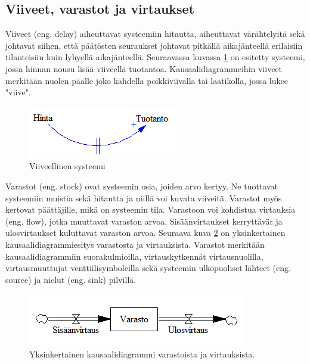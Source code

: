 \documentclass[finnish,12pt,a4paper,pdftex]{article}
\begin{document}
\begin{onehalfspacing}
\clearpage
\subsection{Viiveet, varastot ja virtaukset \label{sysdyn:vvv}}

Viiveet (eng. delay) aiheuttavat systeemiin hitautta, aiheuttavat värähtelyitä sekä johtavat siihen, että päätösten seuraukset johtavat pitkällä aikajänteellä erilaisiin tilanteisiin kuin lyhyellä aikajänteellä. Seuraavassa kuvassa \ref{sysdyn:viive} on esitetty systeemi, jossa hinnan nousu lisää viiveellä tuotantoa. Kausaalidiagrammeihin viiveet merkitään nuolen päälle joko kahdella poikkiviivalla tai laatikolla, jossa lukee "viive". \cite[s. 150--152]{Sterman2000} 

\begin{figure}[H]
\centering \includegraphics{viive}
\caption{Viiveellinen systeemi \cite[s. 150]{Sterman2000} \label{sysdyn:viive}}
\end{figure}

Varastot (eng. stock) ovat systeemin osia, joiden arvo kertyy. Ne tuottavat systeemiin muistia sekä hitautta ja niillä voi kuvata viiveitä. Varastot myös kertovat päättäjille, mikä on systeemin tila. Varastoon voi kohdistua virtauksia (eng. flow), jotka muuttavat varaston arvoa. Sisäänvirtaukset kerryttävät ja ulosvirtaukset kuluttavat varaston arvoa. Seuraava kuva \ref{sysdyn:varastovirtaus} on yksinkertainen kausaalidiagrammiesitys varastosta ja virtauksista. Varastot merkitään kausaalidiagrammiin suorakulmioilla, virtauskytkennät virtausnuolilla, virtausmuuttujat venttiilisymboleilla sekä systeemin ulkopuoliset lähteet (eng. source) ja nielut (eng. sink) pilvillä. \cite[s. 191--197]{Sterman2000} 

\begin{figure}[H]
\centering \includegraphics{varastovirtaus}
\caption{Yksinkertainen kausaalidiagrammi varastoista ja virtauksista. \cite[s. 150]{Sterman2000} \label{sysdyn:varastovirtaus}}
\end{figure}


\end{onehalfspacing}
\end{document}
